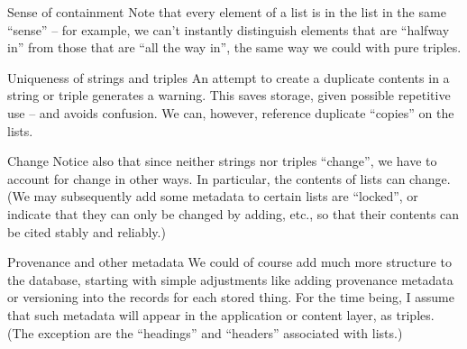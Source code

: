 \begin{notate}{Sense of containment}
Note that every element of a list is in the list in the
same ``sense'' -- for example, we can't instantly
distinguish elements that are ``halfway in'' from those
that are ``all the way in'', the same way we could with
pure triples.
\end{notate}


\begin{notate}{Uniqueness of strings and triples} \label{unique-things}
An attempt to create a duplicate contents in a string or
triple generates a warning.  This saves storage, given
possible repetitive use -- and avoids confusion.  We can,
however, reference duplicate ``copies'' on the lists.
\end{notate}

\begin{notate}{Change} \label{change}
Notice also that since neither strings nor triples
``change'', we have to account for change in other ways.
In particular, the contents of lists can change.  (We may
subsequently add some metadata to certain lists are
``locked'', or indicate that they can only be changed by
adding, etc., so that their contents can be cited stably
and reliably.)
\end{notate}


\begin{notate}{Provenance and other metadata} \label{provenance}
We could of course add much more structure to the
database, starting with simple adjustments like adding
provenance metadata or versioning into the records for
each stored thing.  For the time being, I assume that such
metadata will appear in the application or content layer,
as triples.  (The exception are the ``headings'' and
``headers'' associated with lists.)
\end{notate}

